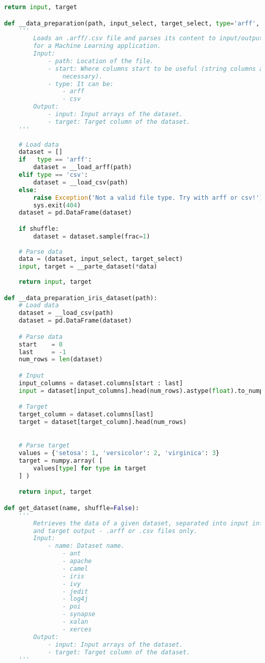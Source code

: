 \begin{lstlisting}[language=Python, caption={Load datasets, calculate metrics, 
export results to CSV files, etc.}, label={lst:data}]
    return input, target

def __data_preparation(path, input_select, target_select, type='arff', shuffle=False):
    '''
        Loads an .arff/.csv file and parses its content to input/output valid 
        for a Machine Learning application.
        Input:
            - path: Location of the file.
            - start: Where columns start to be useful (string columns are not 
                necessary).
            - type: It can be:
                - arff
                - csv
        Output:
            - input: Input arrays of the dataset.
            - target: Target column of the dataset.
    '''
    
    # Load data
    dataset = []
    if   type == 'arff':
        dataset = __load_arff(path)
    elif type == 'csv':
        dataset = __load_csv(path)
    else:
        raise Exception('Not a valid file type. Try with arff or csv!')
        sys.exit(404)
    dataset = pd.DataFrame(dataset)

    if shuffle:
        dataset = dataset.sample(frac=1)
    
    # Parse data
    data = (dataset, input_select, target_select)
    input, target = __parte_dataset(*data)
    
    return input, target

def __data_preparation_iris_dataset(path):
    # Load data
    dataset = __load_csv(path)
    dataset = pd.DataFrame(dataset)

    # Parse data
    start    = 0
    last     = -1
    num_rows = len(dataset)

    # Input
    input_columns = dataset.columns[start : last]
    input = dataset[input_columns].head(num_rows).astype(float).to_numpy()

    # Target
    target_column = dataset.columns[last]
    target = dataset[target_column].head(num_rows)
    

    # Parse target
    values = {'setosa': 1, 'versicolor': 2, 'virginica': 3}
    target = numpy.array( [
        values[type] for type in target
    ] )

    return input, target

def get_dataset(name, shuffle=False):
    '''
        Retrieves the data of a given dataset, separated into input information
        and target output - .arff or .csv files only.
        Input:
            - name: Dataset name.
                - ant
                - apache
                - camel
                - iris
                - ivy
                - jedit
                - log4j
                - poi
                - synapse
                - xalan
                - xerces
        Output:
            - input: Input arrays of the dataset.
            - target: Target column of the dataset.
    '''


\end{lstlisting}
